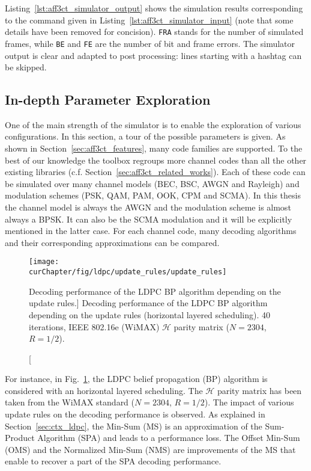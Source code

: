 \begin{listing}[htp]
  \inputminted[frame=lines,linenos]{console}{\curChapter/src/use_cases/simulator/output.txt}
  \caption{Example of an \AFFECT simulator output.}
  \label{lst:aff3ct_simulator_output}
\end{listing}

Listing~\ref{lst:aff3ct_simulator_output} shows the simulation results
corresponding to the \AFFECT command given in
Listing~\ref{lst:aff3ct_simulator_input} (note that some details have been
removed for concision). \verb|FRA| stands for the number of simulated frames,
while \verb|BE| and \verb|FE| are the number of bit and frame errors. The
simulator output is clear and adapted to post processing: lines starting with a
hashtag can be skipped.

\subsection{In-depth Parameter Exploration}

One of the main strength of the \AFFECT simulator is to enable the exploration
of various configurations. In this section, a tour of the possible parameters is
given. As shown in Section~\ref{sec:aff3ct_features}, many code families are
supported. To the best of our knowledge the \AFFECT toolbox regroups more
channel codes than all the other existing libraries (c.f.
Section~\ref{sec:aff3ct_related_works}). Each of these code can be simulated
over many channel models (BEC, BSC, AWGN and Rayleigh) and modulation schemes
(PSK, QAM, PAM, OOK, CPM and SCMA). In this thesis the channel model is always
the AWGN and the modulation scheme is almost always a BPSK. It can also be the
SCMA modulation and it will be explicitly mentioned in the latter case. For each
channel code, many decoding algorithms and their corresponding approximations
can be compared.

\begin{figure}[htp]
  \centering
  \texttt{[image: \\curChapter/fig/ldpc/update\_rules/update\_rules]}
  \caption
    [Decoding performance of the LDPC BP algorithm depending on the update
     rules.]
    {Decoding performance of the LDPC BP algorithm depending on the update rules
     (horizontal layered scheduling). 40 iterations, IEEE 802.16e (WiMAX)
     $\mathcal{H}$ parity matrix ($N=2304$, $R=1/2$).}
  \label{plot:aff3ct_ldpc_update_rules}
\end{figure}

For instance, in Fig.~\ref{plot:aff3ct_ldpc_update_rules}, the LDPC belief
propagation (BP) algorithm is considered with an horizontal layered scheduling.
The $\mathcal{H}$ parity matrix has been taken from the WiMAX standard
($N=2304$, $R=1/2$). The impact of various update rules on the decoding
performance is observed. As explained in Section~\ref{sec:ctx_ldpc}, the Min-Sum
(MS) is an approximation of the Sum-Product Algorithm (SPA) and leads to a
performance loss. The Offset Min-Sum (OMS) and the Normalized Min-Sum (NMS) are
improvements of the MS that enable to recover a part of the SPA decoding
performance.

